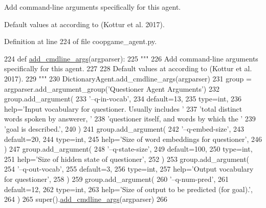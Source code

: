 \begin{DoxyVerb}Add command-line arguments specifically for this agent.

Default values at according to (Kottur et al. 2017).
\end{DoxyVerb}
 

Definition at line 224 of file coopgame\+\_\+agent.\+py.


\begin{DoxyCode}
224     \textcolor{keyword}{def }\hyperlink{namespaceparlai_1_1agents_1_1drqa_1_1config_a62fdd5554f1da6be0cba185271058320}{add\_cmdline\_args}(argparser):
225         \textcolor{stringliteral}{"""}
226 \textcolor{stringliteral}{        Add command-line arguments specifically for this agent.}
227 \textcolor{stringliteral}{}
228 \textcolor{stringliteral}{        Default values at according to (Kottur et al. 2017).}
229 \textcolor{stringliteral}{        """}
230         DictionaryAgent.add\_cmdline\_args(argparser)
231         group = argparser.add\_argument\_group(\textcolor{stringliteral}{'Questioner Agent Arguments'})
232         group.add\_argument(
233             \textcolor{stringliteral}{'--q-in-vocab'},
234             default=13,
235             type=int,
236             help=\textcolor{stringliteral}{'Input vocabulary for questioner. Usually includes '}
237             \textcolor{stringliteral}{'total distinct words spoken by answerer, '}
238             \textcolor{stringliteral}{'questioner itself, and words by which the '}
239             \textcolor{stringliteral}{'goal is described.'},
240         )
241         group.add\_argument(
242             \textcolor{stringliteral}{'--q-embed-size'},
243             default=20,
244             type=int,
245             help=\textcolor{stringliteral}{'Size of word embeddings for questioner'},
246         )
247         group.add\_argument(
248             \textcolor{stringliteral}{'--q-state-size'},
249             default=100,
250             type=int,
251             help=\textcolor{stringliteral}{'Size of hidden state of questioner'},
252         )
253         group.add\_argument(
254             \textcolor{stringliteral}{'--q-out-vocab'},
255             default=3,
256             type=int,
257             help=\textcolor{stringliteral}{'Output vocabulary for questioner'},
258         )
259         group.add\_argument(
260             \textcolor{stringliteral}{'--q-num-pred'},
261             default=12,
262             type=int,
263             help=\textcolor{stringliteral}{'Size of output to be predicted (for goal).'},
264         )
265         super().\hyperlink{namespaceparlai_1_1agents_1_1drqa_1_1config_a62fdd5554f1da6be0cba185271058320}{add\_cmdline\_args}(argparser)
266 
\end{DoxyCode}
\mbox{\label{classprojects_1_1taskntalk_1_1coopgame__agent_1_1QuestionerAgent_adb16896b49988a6f20ae07268a14fbaf}} 
